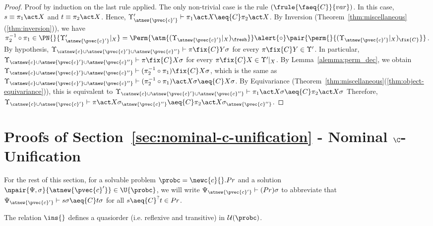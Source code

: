  \begin{proof}
    Proof by induction on the last rule applied. The only non-trivial case is the rule $(\frule{\faeq{C}}{var})$. In this case, $s \equiv \pi_1\act X$ and $t \equiv \pi_2\act X$. Hence, $\Upsilon'_{\atnew{\pvec{c}'}}\vdash \pi_1\act X\aeq{C} \pi_2\act X$. By Inversion (Theorem~\ref{thm:miscellaneous}(\ref{thm:inversion})), we have $\pi_2^{-1}\circ\pi_1\in \PN{}{\Upsilon'_{\atnew{\pvec{c}'}}|_X} = \Perm{\atm{(\Upsilon_{\atnew{\pvec{c}'}}|_X)_{\fresh}}}\alert{\circ}\pair{\perm{}{(\Upsilon_{\atnew{\pvec{c}'}}|_X)_{\fix{C}}}}$. By hypothesis, $\Upsilon_{\catnew{c}\cup\atnew{\pvec{c}'}\cup\atnew{\pvec{c}''}}\vdash \pi\fix{C} Y\sigma$ for every $\pi\fix{C} Y\in \Upsilon'$. In particular, $\Upsilon_{\catnew{c}\cup\atnew{\pvec{c}'}\cup\atnew{\pvec{c}''}} \vdash \pi\fix{C} X\sigma$ for every $\pi\fix{C} X\in \Upsilon'|_X$. By Lemma~\ref{alemma:perm_dec}, we obtain $\Upsilon_{\catnew{c}\cup\atnew{\pvec{c}'}\cup\atnew{\pvec{c}''}} \vdash (\pi_2^{-1}\circ\pi_1)\fix{C} X\sigma$, which is the same as  $\Upsilon_{\catnew{c}\cup\atnew{\pvec{c}'}\cup\atnew{\pvec{c}''}} \vdash (\pi_2^{-1}\circ\pi_1)\act X\sigma \aeq{C} X\sigma$. By Equivariance (Theorem~\ref{thm:miscellaneous}(\ref{thm:object-equivariance})), this is equivalent to $\Upsilon_{\catnew{c}\cup\atnew{\pvec{c}'}\cup\atnew{\pvec{c}''}} \vdash \pi_1\act X\sigma \aeq{C} \pi_2\act X\sigma$ Therefore, $\Upsilon_{\catnew{c}\cup\atnew{\pvec{c}'}} \vdash \pi\act X\sigma_{\atnew{\pvec{c}''}} \aeq{C} \pi_2\act X\sigma_{\atnew{\pvec{c}''}}$.
\end{proof}


\section{Proofs of Section~\ref{sec:nominal-c-unification} - Nominal \texorpdfstring{$\C$}{C}-Unification}\label{app:nominal-c-unification}

For the rest of this section, for a solvable problem $\probc = \newc{c}{}.Pr$ and a solution $\npair{\Psi,\sigma}{\atnew{\pvec{c}'}}\in \U{\probc}$, we will write $\Psi_{\atnew{\pvec{c}'}} \vdash (Pr)\sigma$ to abbreviate that $\Psi_{\atnew{\pvec{c}'}} \vdash s\sigma\aeq{C} t\sigma$ for all $s\aeq{C}^? t\in Pr$.

\begin{lemma}\label{alemma:quasiorder}
    The relation $\ins{}$ defines a quasiorder (i.e. reflexive and transitive) in $\mathcal{U}(\probc)$.
\end{lemma}

